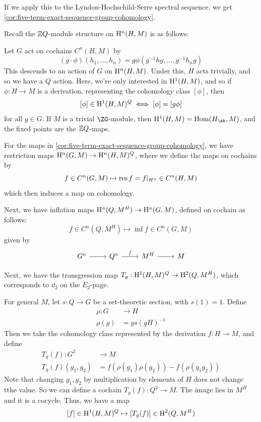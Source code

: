 \documentclass{article}
\begin{document}
If we apply this to the Lyndon-Hochschild-Serre spectral sequence, we get \cref{cor:five-term-exact-sequence-group-cohomology}.

Recall the \(\mathbb{Z} Q\)-module structure on \(\mathrm{H}^n(H, M)\) is as follows:

Let \(G\) act on cochains \(C^n(H, M)\) by
\[(g\cdot\phi)(h_1, \dots, h_n) = g\phi(g^{-1}hg, \dots, g^{-1}h_ng)\]
This descends to an action of \(G\) on \(\mathrm{H}^n(H, M)\). Under this, \(H\) acts trivially, and so we have a \(Q\) action. Here, we're only interested in \(\mathrm{H}^1(H, M)\), and so if \(\phi : H \to M\) is a derivation, representing the cohomology class \([\phi]\), then
\[[\phi] \in \mathrm{H}^1(H, M)^{Q} \iff [\phi] = [g\phi]\]
for all \(g \in G\). If \(M\) is a trivial \(\ZG\)-module, then \(\HH^1(H, M) = \Hom(H_\ab, M)\), and the fixed points are the \(\mathbb{Z} Q\)-maps.

For the maps in \cref{cor:five-term-exact-sequence-group-cohomology}, we have restriction maps \(\mathrm{H}^n(G, M) \to \mathrm{H}^n(H, M)^Q\), where we define the maps on cochains by
\[f \in C^n(G, M) \mapsto \operatorname{res} f = f\vert_{H^n} \in C^n(H, M)\]
which then induces a map on cohomology.

Next, we have inflation maps \(\mathrm{H}^n(Q, M^H) \to \mathrm{H}^n(G, M)\), defined on cochain as follows:
\[f \in C^n(Q, M^H) \mapsto \inf f \in C^n(G, M)\]
given by
\[\begin{tikzcd}
	{G^n} & {Q^n} & {M^H} & M
	\arrow[from=1-1, to=1-2]
	\arrow["f", from=1-2, to=1-3]
	\arrow[from=1-3, to=1-4]
\end{tikzcd}\]

Next, we have the transgression map \(T_g : \mathrm{H}^1(H, M)^Q \to \mathrm{H}^2(Q, M^H)\), which corresponds to \(\dd_2\) on the \(E_2\)-page.

For general \(M\), let \(s : Q \to G\) be a set-theoretic section, with \(s(1) = 1\). Define
\begin{align*}
    \rho : G &\to H \\
    \rho(g) &= g s(gH)^{-1}
\end{align*}
Then we take the cohomology class represented by the derivation \(f : H \to M\), and define
\begin{align*}
    T_g(f) : G^2 &\to M \\
    T_g(f)(g_1, g_2) &= f(\rho(g_1)\rho(g_2)) - f(\rho(g_1g_2))
\end{align*}
Note that changing \(g_1, g_2\) by multiplication by elements of \(H\) does not change tthe value. So we can define a cochain \(T_g(f) : Q^2 \to M\). The image lies in \(M^H\) and it is a cocycle. Thus, we have a map
\[[f] \in \mathrm{H}^1(H, M)^Q \mapsto [T_g(f)] \in \mathrm{H}^2(Q, M^H)\]
\end{document}
